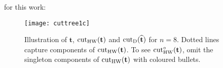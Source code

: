 \documentclass[11pt,a4paper]{article}
\newcommand{\ft}{\mathbf{t}}
\begin{document}
for this work:
\begin{center}
\begin{figure}[t]\centering
\texttt{[image: cuttree1c]}\vspace{-0.3cm}
  \caption{Illustration of $\mathbf{t}$, ${\rm cut}_{\rm HW}(\mathbf{t})$ and ${\rm cut}_{\rm D}(\widehat{\mathbf{t}})$ for $n=8$. Dotted lines capture components of ${\rm cut}_{\rm HW}(\ft)$. To see ${\rm cut}_{\rm HW}^\circ(\mathbf{t})$, omit the singleton components of ${\rm cut}_{\rm HW}(\mathbf{t})$ with coloured bullets.}
    \label{fig1}\vspace{-0.2cm}
\end{figure}
\end{center}
\end{document}
